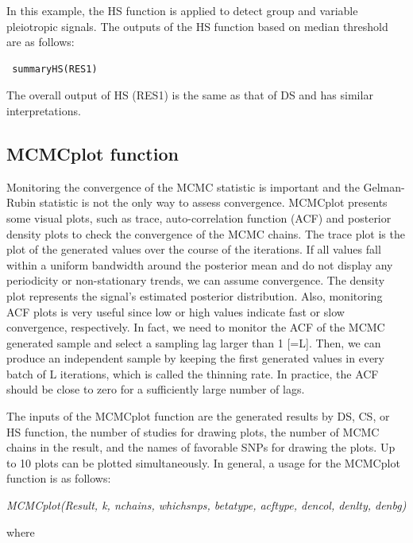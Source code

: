 In this example, the HS function is applied to detect group and variable pleiotropic signals. The outputs of the HS function based on median threshold are as follows:

\begin{verbatim}
 summaryHS(RES1)
\end{verbatim}

The overall output of HS (RES1) is the same as that of DS and has similar interpretations.

\hypertarget{mcmcplot-function}{%
\subsection{MCMCplot function}\label{mcmcplot-function}}

Monitoring the convergence of the MCMC statistic is important and the Gelman-Rubin statistic is not the only way to assess convergence. MCMCplot presents some visual plots, such as trace, auto-correlation function (ACF) and posterior density plots to check the convergence of the MCMC chains.
The trace plot is
the plot of the generated values over the course of the iterations. If
all values fall within a uniform bandwidth around the posterior mean and do not display any periodicity or non-stationary trends, we can assume convergence. The density plot represents the signal's estimated posterior distribution. Also, monitoring ACF plots is very useful since low or high values indicate fast or slow convergence, respectively. In fact, we need to monitor the ACF of the MCMC generated sample and select a sampling lag larger than 1 {[}=L{]}. Then, we can produce an independent sample by keeping the first generated values in every batch of L iterations, which is called the thinning rate.
In practice, the ACF should be close to zero for a sufficiently large number of lags.

The inputs of the MCMCplot function are the generated results by DS, CS, or HS function, the number of studies for drawing plots, the number of MCMC chains in the result, and
the names of favorable SNPs for drawing the plots.
Up to 10 plots can be plotted simultaneously. In general, a usage for the MCMCplot function is as follows:

\emph{MCMCplot(Result, k, nchains, whichsnps, betatype, acftype, dencol, denlty, denbg)}

where

